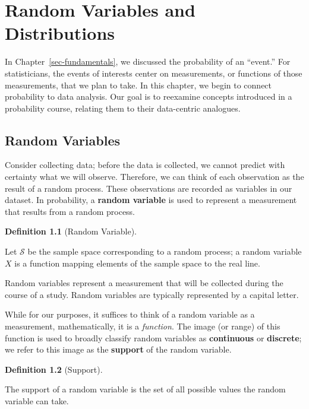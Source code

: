 \documentclass[
  letterpaper,
  DIV=11,
  numbers=noendperiod]{scrreprt}
\theoremstyle{plain}
\theoremstyle{definition}
\newtheorem{definition}{Definition}[chapter]
\theoremstyle{definition}
\theoremstyle{remark}
\begin{document}

\hypertarget{sec-randomvariables}{%
\chapter{Random Variables and Distributions}\label{sec-randomvariables}}

In Chapter~\ref{sec-fundamentals}, we discussed the probability of an
``event.'' For statisticians, the events of interests center on
measurements, or functions of those measurements, that we plan to take.
In this chapter, we begin to connect probability to data analysis. Our
goal is to reexamine concepts introduced in a probability course,
relating them to their data-centric analogues.

\hypertarget{random-variables}{%
\section{Random Variables}\label{random-variables}}

Consider collecting data; before the data is collected, we cannot
predict with certainty what we will observe. Therefore, we can think of
each observation as the result of a random process. These observations
are recorded as variables in our dataset. In probability, a
\textbf{random variable} is used to represent a measurement that results
from a random process.

\begin{definition}[Random
Variable]\protect\hypertarget{def-random-variable}{}\label{def-random-variable}

Let \(\mathcal{S}\) be the sample space corresponding to a random
process; a random variable \(X\) is a function mapping elements of the
sample space to the real line.

Random variables represent a measurement that will be collected during
the course of a study. Random variables are typically represented by a
capital letter.

\end{definition}

While for our purposes, it suffices to think of a random variable as a
measurement, mathematically, it is a \emph{function}. The image (or
range) of this function is used to broadly classify random variables as
\textbf{continuous} or \textbf{discrete}; we refer to this image as the
\textbf{support} of the random variable.

\begin{definition}[Support]\protect\hypertarget{def-support}{}\label{def-support}

The support of a random variable is the set of all possible values the
random variable can take.

\end{definition}
\end{document}
